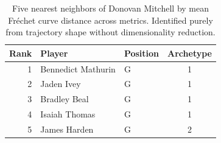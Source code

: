 \begin{table}[htbp]
  \centering\small
  \begin{tabular}{rllc}
    \toprule
    Rank & Player & Position & Archetype \\
    \midrule
    1 & Bennedict Mathurin & G & 1 \\
    2 & Jaden Ivey & G & 1 \\
    3 & Bradley Beal & G & 1 \\
    4 & Isaiah Thomas & G & 1 \\
    5 & James Harden & G & 2 \\
    \bottomrule
  \end{tabular}
  \caption{Five nearest neighbors of Donovan Mitchell by mean Fr\'{e}chet curve distance across metrics. Identified purely from trajectory shape without dimensionality reduction.}
  \label{tab:Donovan_Mitchell_frechet_curve_neighbors}
\end{table}

